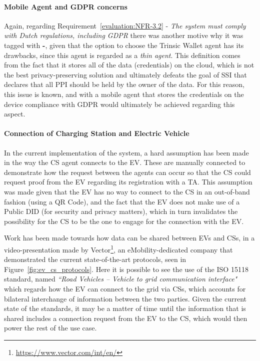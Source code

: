 \paragraph{Mobile Agent and GDPR concerns}

Again, regarding Requirement~\ref{evaluation:NFR-3.2} - \textit{The system must comply with Dutch regulations, including GDPR} there was another motive why it was tagged with \textbf{-}, given that the option to choose the Trinsic Wallet agent has its drawbacks, since this agent is regarded as a \textit{thin agent}. This definition comes from the fact that it stores all of the data (credentials) on the cloud, which is not the best privacy-preserving solution and ultimately defeats the goal of SSI that declares that all PPI should be held by the owner of the data. For this reason, this issue is known, and with a mobile agent that stores the credentials on the device compliance with GDPR would ultimately be achieved regarding this aspect.

\paragraph{Connection of Charging Station and Electric Vehicle}

In the current implementation of the system, a hard assumption has been made in the way the CS agent connects to the EV. These are manually connected to demonstrate how the request between the agents can occur so that the CS could request proof from the EV regarding its registration with a TA. This assumption was made given that the EV has no way to connect to the CS in an out-of-band fashion (using a QR Code), and the fact that the EV does not make use of a Public DID (for security and privacy matters), which in turn invalidates the possibility for the CS to be the one to engage for the connection with the EV.

Work has been made towards how data can be shared between EVs and CSs, in a video-presentation made by Vector\footnote{\url{https://www.vector.com/int/en/}}, an eMobility-dedicated company that demonstrated the current state-of-the-art protocols, seen in Figure~\ref{fig:ev_cs_protocols}. Here it is possible to see the use of the ISO 15118 standard, named \textit{“Road Vehicles – Vehicle to grid communication interface"} which regards how the EV can connect to the grid via CSs, which accounts for bilateral interchange of information between the two parties. Given the current state of the standards, it may be a matter of time until the information that is shared includes a connection request from the EV to the CS, which would then power the rest of the use case.

